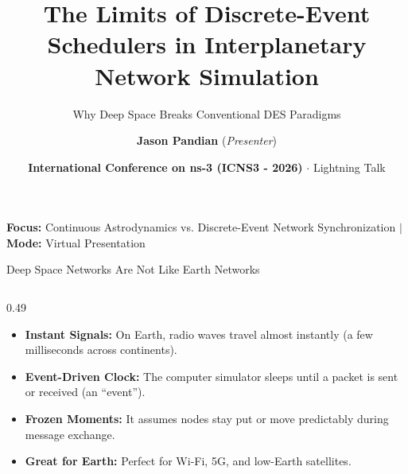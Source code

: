 \documentclass[aspectratio=169,10pt]{beamer}
\title[\textbf{Limits of DES in Interplanetary Sim}]{\textbf{The Limits of Discrete-Event Schedulers in Interplanetary Network Simulation}}
\subtitle{Why Deep Space Breaks Conventional DES Paradigms}
\author[\textbf{Jason Pandian}]{\textbf{Jason Pandian} (\textit{Presenter})}
\institute[NIT]{
  Department of Information Technology, Nehru Institute of Technology, Coimbatore, India
}
\date[\textbf{ICNS3 - 2026}]{\textbf{International Conference on ns-3 (ICNS3 - 2026)} $\cdot$ Lightning Talk}
\begin{document}
\begin{frame}[plain]
  \titlepage
  \vspace{-12pt}
  \centering
  {\footnotesize \color{spaceNavy}
  \textbf{Focus:} Continuous Astrodynamics vs. Discrete-Event Network Synchronization \quad $\vert$ \quad \textbf{Mode:} Virtual Presentation}
\end{frame}
\setcounter{framenumber}{0}

\begin{frame}{Deep Space Networks Are Not Like Earth Networks}
  \begin{columns}[T]
    \begin{column}{0.49\textwidth}
      \begin{tcolorbox}[colback=cardBg,colframe=spaceNavy,title=\textbf{How Terrestrial Simulators Work (e.g., ns-3)}]
        \small
        \begin{itemize}\setlength{\itemsep}{0.8pt}
          \item \textbf{Instant Signals:} On Earth, radio waves travel almost instantly (a few milliseconds across continents).
          \item \textbf{Event-Driven Clock:} The computer simulator sleeps until a packet is sent or received (an ``event'').
          \item \textbf{Frozen Moments:} It assumes nodes stay put or move predictably during message exchange.
          \item \textbf{Great for Earth:} Perfect for Wi-Fi, 5G, and low-Earth satellites.
        \end{itemize}
      \end{tcolorbox}
    \end{column}


\end{columns}
\end{frame}
\end{document}
